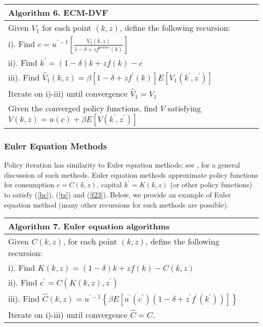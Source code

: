 \qquad \newline

{\small
\begin{tabular}{l}
\hline \hline
\textbf{Algorithm 6. ECM-DVF} \\ \hline
Given $V_{1}$ for each point $\left( k,z\right) $, define the following recursion: \\
\quad i). Find $c = u^{\prime -1}\left[ \frac{V_{1}\left(k, z\right)}{1 - \delta +z f^{ prime}\left(k\right) }\right]$ \\
\quad ii). Find $k^{\prime }=\left( 1-\delta \right) k+zf\left( k\right) -c$ \\
\quad iii). Find $\widehat{V}_{1}\left(k, z\right) =\beta \left[ 1-\delta +z f^{\prime }\left(k\right) \right] E \left[V_{1}\left(k^{\prime}, z^{\prime }\right) \right]$ \\
Iterate on i)-iii) until convergence $\widehat{V}_{1}=V_{1}$ \\
Given the converged policy functions, find $V$ satisfying $V\left(k, z\right) = u\left(c\right) + \beta E \left[V\left(k^{\prime }, z^{\prime}\right) \right]$ \\ \hline \hline
\end{tabular}
}

\subsubsection{Euler Equation Methods}

Policy iteration has similarity to Euler equation methods; see \cite
{Judd1998}, \cite{Santos1999} for a general discussion of such methods. Euler
equation methods approximate policy functions for consumption $ c=C\left(
k,z\right) $, capital $k^{\prime }=K\left( k,z\right) $ (or other policy
functions) to satisfy (\ref{bc}), (\ref{ts}) and (\ref{f23}). Below, we provide
an example of Euler equation method (many other recursions for such methods are
possible).

\qquad \newline

{\small
\begin{tabular}{l}
\hline \hline
\textbf{Algorithm 7. Euler equation algorithms} \\ \hline
Given $C\left( k,z\right) $, for each point $\left( k,z\right) $, define the
following recursion: \\
\quad i). Find $K\left(k, z\right) =\left(1 - \delta\right) k + z f\left(k\right) -C\left( k,z\right)$ \\
\quad ii). Find $c^{\prime} = C\left(K\left(k, z\right), z^{\prime}\right)$ \\
\quad iii). Find $\widehat{C}\left(k, z\right) = u^{\prime -1}\left \{\beta E \left[ u^{\prime}\left(c^{\prime}\right) \left(1 - \delta + z^{\prime} f^{\prime}\left(k^{\prime}\right) \right) \right] \right \}$ \\
Iterate on i)-iii) until convergence $\widehat{C}=C$. \\ \hline \hline
\end{tabular}
}

